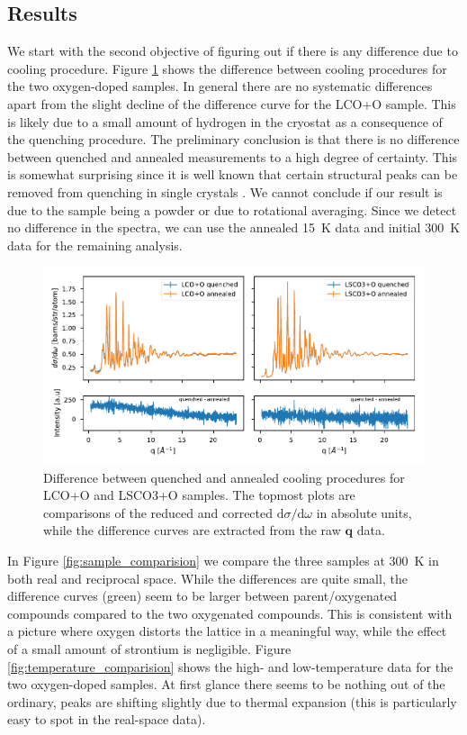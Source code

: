 \subsection{Results}
We start with the second objective of figuring out if there is any difference due to cooling procedure. Figure \ref{fig:difference} shows the difference between cooling procedures for the two oxygen-doped samples. In general there are no systematic differences apart from the slight decline of the difference curve for the LCO+O sample. This is likely due to a small amount of hydrogen in the cryostat as a consequence of the quenching procedure. The preliminary conclusion is that there is no difference between quenched and annealed measurements to a high degree of certainty. This is somewhat surprising since it is well known that certain structural peaks can be removed from quenching in single crystals \cite{Poccia2012}. We cannot conclude if our result is due to the sample being a powder or due to rotational averaging. Since we detect no difference in the spectra, we can use the annealed \SI{15}{\kelvin} data and initial \SI{300}{\kelvin} data for the remaining analysis.


\begin{figure}
    \centering
    \includegraphics[width=\textwidth]{fig/pdf/quenched_annealed.pdf}
    \caption{Difference between quenched and annealed cooling procedures for LCO+O and LSCO3+O samples. The topmost plots are comparisons of the reduced and corrected $\text{d}\sigma/\text{d}\omega$ in absolute units, while the difference curves are extracted from the raw $\bm{q}$ data.}
    \label{fig:difference}
\end{figure}

In Figure \ref{fig:sample_comparision} we compare the three samples at \SI{300}{\kelvin} in both real and reciprocal space. While the differences are quite small, the difference curves (green) seem to be larger between parent/oxygenated compounds compared to the two oxygenated compounds. This is consistent with a picture where oxygen distorts the lattice in a meaningful way, while the effect of a small amount of strontium is negligible. Figure \ref{fig:temperature_comparision} shows the high- and low-temperature data for the two oxygen-doped samples. At first glance there seems to be nothing out of the ordinary, peaks are shifting slightly due to thermal expansion (this is particularly easy to spot in the real-space data).


